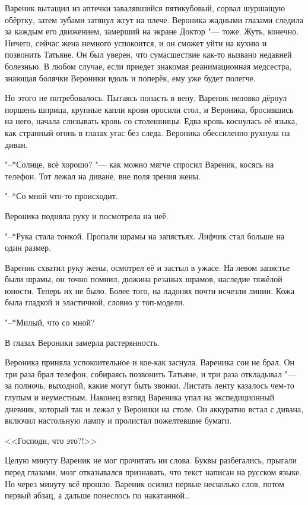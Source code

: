 Вареник вытащил из аптечки завалявшийся пятикубовый, сорвал шуршащую обёртку, затем зубами затянул жгут на плече.
Вероника жадными глазами следила за каждым его движением, замерший на экране Доктор "--- тоже.
Жуть, конечно.
Ничего, сейчас жена немного успокоится, и он сможет уйти на кухню и позвонить Татьяне.
Он был уверен, что сумасшествие как-то вызвано недавней болезнью.
В любом случае, если приедет знакомая реанимационная медсестра, знающая болячки Вероники вдоль и поперёк, ему уже будет полегче.

Но этого не потребовалось.
Пытаясь попасть в вену, Вареник неловко дёрнул поршень шприца, крупные капли крови оросили стол, и Вероника, бросившись на него, начала слизывать кровь со столешницы.
Едва кровь коснулась её языка, как странный огонь в глазах угас без следа.
Вероника обессиленно рухнула на диван.

"--*Солнце, всё хорошо? "--- как можно мягче спросил Вареник, косясь на телефон.
Тот лежал на диване, вне поля зрения жены.

"--*Со мной что-то происходит.

Вероника подняла руку и посмотрела на неё.

"--*Рука стала тонкой.
Пропали шрамы на запястьях.
Лифчик стал больше на один размер.

Вареник схватил руку жены, осмотрел её и застыл в ужасе.
На левом запястье были шрамы, он точно помнил, дюжина резаных шрамов, наследие тяжёлой юности.
Теперь их не было.
Более того, на ладонях почти исчезли линии.
Кожа была гладкой и эластичной, словно у топ-модели.

"--*Милый, что со мной?

В глазах Вероники замерла растерянность.

\asterism

\label{Sun_2012_07_08}

Вероника приняла успокоительное и кое-как заснула.
Вареника сон не брал.
Он три раза брал телефон, собираясь позвонить Татьяне, и три раза откладывал "--- за полночь, выходной, какие могут быть звонки.
Листать ленту казалось чем-то глупым и неуместным.
Наконец взгляд Вареника упал на экспедиционный дневник, который так и лежал у Вероники на столе.
Он аккуратно встал с дивана, включил настольную лампу и пролистал пожелтевшие бумаги.

<<Господи, что это?!>>

Целую минуту Вареник не мог прочитать ни слова.
Буквы разбегались, прыгали перед глазами, мозг отказывался признавать, что текст написан на русском языке.
Но через минуту всё прошло.
Вареник осилил первые несколько слов, потом первый абзац, а дальше понеслось по накатанной\ldots{}

